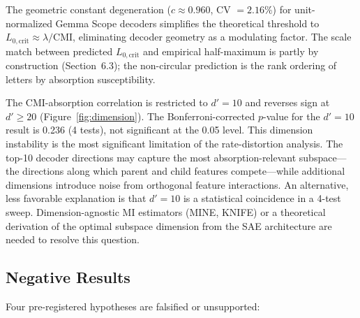 \documentclass{article}
\begin{document}
The geometric constant degeneration ($c \approx 0.960$, CV $= 2.16\%$) for unit-normalized Gemma Scope decoders simplifies the theoretical threshold to $L_{0,\text{crit}} \approx \lambda / \text{CMI}$, eliminating decoder geometry as a modulating factor. The scale match between predicted $L_{0,\text{crit}}$ and empirical half-maximum is partly by construction (Section~6.3); the non-circular prediction is the rank ordering of letters by absorption susceptibility.

The CMI-absorption correlation is restricted to $d' = 10$ and reverses sign at $d' \geq 20$ (Figure~\ref{fig:dimension}). The Bonferroni-corrected $p$-value for the $d' = 10$ result is 0.236 (4 tests), not significant at the 0.05 level. This dimension instability is the most significant limitation of the rate-distortion analysis. The top-10 decoder directions may capture the most absorption-relevant subspace---the directions along which parent and child features compete---while additional dimensions introduce noise from orthogonal feature interactions. An alternative, less favorable explanation is that $d' = 10$ is a statistical coincidence in a 4-test sweep. Dimension-agnostic MI estimators (MINE, KNIFE) or a theoretical derivation of the optimal subspace dimension from the SAE architecture are needed to resolve this question.

\subsection{Negative Results}

Four pre-registered hypotheses are falsified or unsupported:
\end{document}
